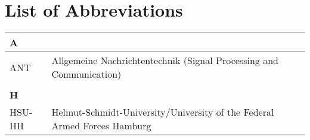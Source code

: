 \chapter*{List of Abbreviations}
\label{sec:abbreviations}
\begin{longtable}[t]{ll}
\arrayrulecolor{hsugrau}
\textbf{\textcolor{hsurot}{A}} &\\ \hline 
ANT & Allgemeine Nachrichtentechnik (Signal Processing and Communication)\\

 
  &\\ \textbf{\textcolor{hsurot}{H}} &\\  \hline 
HSU-HH & Helmut-Schmidt-University/University of the Federal Armed Forces Hamburg\\

\end{longtable}